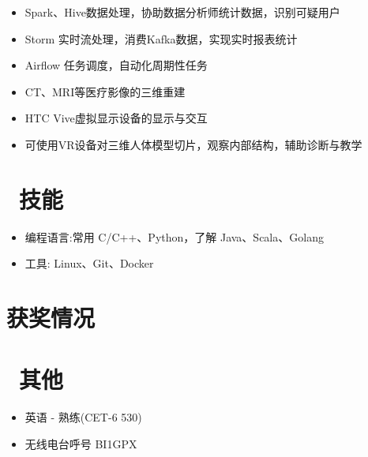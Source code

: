 \documentclass{resume}
\begin{document}
\begin{itemize}[topsep = 0 pt, partopsep = 0pt]
  \item Spark、Hive数据处理，协助数据分析师统计数据，识别可疑用户
  \item Storm 实时流处理，消费Kafka数据，实现实时报表统计
  \item Airflow 任务调度，自动化周期性任务
\end{itemize}

\begin{itemize}[topsep = 0 pt, partopsep = 0pt]
  \item CT、MRI等医疗影像的三维重建
  \item HTC Vive虚拟显示设备的显示与交互
  \item 可使用VR设备对三维人体模型切片，观察内部结构，辅助诊断与教学
\end{itemize}

\section{\faCogs\ 技能}
\begin{itemize}[parsep=0.5ex]
  \item 编程语言:常用 C/C++、Python，了解 Java、Scala、Golang
  \item 工具: Linux、Git、Docker
\end{itemize}

\section{获奖情况}

\section{\faInfo\ 其他}
\begin{itemize}[parsep=0.5ex]
  \item  英语 - 熟练(CET-6 530)
  \item  无线电台呼号 BI1GPX
\end{itemize}
\end{document}
